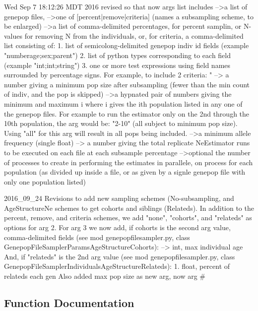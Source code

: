 \begin{DoxyVerb}
Wed Sep  7 18:12:26 MDT 2016
    revised so that now args list includes
    -->a list of genepop files, 
    -->one of [percent|remove|criteria] (names a subsampling scheme, to be enlarged)
    -->a list of comma-delimited percentages, for percent samplin, or N-values for removing N
from the individuals, or, for criteria, a comma-delimited list consisting of:
        1. list of semicolong-delimited genepop indiv id fields (example "numberage;sex;parent")
        2. list of python types corresponding to each field (example "int;int;string")
        3. one or more test expressions using field names 
            surrounded by percentage signs.  For example, to include 
            2 criteria: "%
    --> a number giving a minimum pop size 
       after subsampling (fewer than the min count of indiv, and the pop is skipped)
    -->a hypnated pair of numbers giving the minimum and maximum i where
i gives the ith population listed in any one of the genepop files. For
example to run the estimator only on the 2nd through the 10th population,
the arg would be: "2-10" (all subject to minimum pop size).  
Using "all" for this arg will result in all pops being included.
    -->a minimum allele frequency (single float)
    --> a number giving the total replicate NeEstimator runs 
to be executed on each file at each subsample percentage 
    -->optional the number of processes to create in performing the
estimates in parallele, on process for each population (as divided up inside a file,
or as given by a signle genepop file with only one population listed)

2016_09_24
    Revisions to add new sampling schemes (No-subsampling, and AgeStructureNe schemes to get
    cohorts and siblings (Relateds).  In addition to the percent, remove, and
    criteria schemes, we add "none", "cohorts", and "relateds" as options for arg 2.
    For arg 3 we now add, if cohorts is the second arg value, comma-delimited
    fields (see mod genepopfilesampler.py, class 
    GenepopFileSamplerParamsAgeStructureCohorts):
    --> int, max individual age
    And, if "relateds" is the 2nd arg value (see mod genepopfilesampler.py, class
    GenepopFileSamplerIndividualsAgeStructureRelateds):
    1. float, percent of relateds each gen
    Also added max pop size as new arg, now arg #
\end{DoxyVerb}
 

\subsection{Function Documentation}
